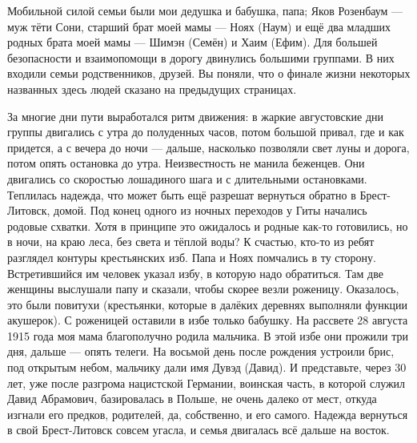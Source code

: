 \label{067-2}
Мобильной силой семьи были мои дедушка и бабушка, папа; Яков Розенбаум — муж тёти Сони, старший брат моей мамы — Ноях (Наум) и ещё два младших родных брата моей мамы — Шимэн (Семён) и Хаим (Ефим). Для большей безопасности и взаимопомощи в дорогу двинулись большими группами. В них входили семьи родственников, друзей. Вы поняли, что о финале жизни некоторых названных здесь людей сказано на предыдущих страницах.

\label{068-1}
За многие дни пути выработался ритм движения: в жаркие августовские дни группы двигались с утра до полуденных часов, потом большой привал, где и как придется, а с вечера до ночи — дальше, насколько позволяли свет луны и дорога, потом опять остановка до утра. Неизвестность не манила беженцев. Они двигались со скоростью лошадиного шага и с длительными остановками. 
Теплилась надежда, что может быть ещё разрешат вернуться обратно в Брест-Литовск, домой. Под конец одного из ночных переходов у Гиты начались родовые схватки. Хотя в принципе это ожидалось и родные как-то готовились, но в ночи, на краю леса, без света и тёплой воды? К счастью, кто-то из ребят разглядел контуры крестьянских изб. Папа и Ноях помчались в ту сторону. Встретившийся им человек указал избу, в которую надо обратиться. 
Там две женщины выслушали папу и сказали, чтобы скорее везли роженицу. Оказалось, это были повитухи (крестьянки, которые в далёких деревнях выполняли функции акушерок). С роженицей оставили в избе только бабушку. На рассвете 28 августа 1915 года моя мама благополучно родила мальчика. В этой избе они прожили три дня, дальше — опять телеги. На восьмой день после рождения устроили брис, под открытым небом, мальчику дали имя Дувэд (Давид). И представьте, через 30 лет, уже после разгрома нацистской Германии, воинская часть, в которой служил Давид Абрамович, базировалась в Польше, не очень далеко от мест, откуда изгнали его предков, родителей, да, собственно, и его самого. Надежда вернуться в свой Брест-Литовск совсем угасла, и семья двигалась всё дальше на восток.


